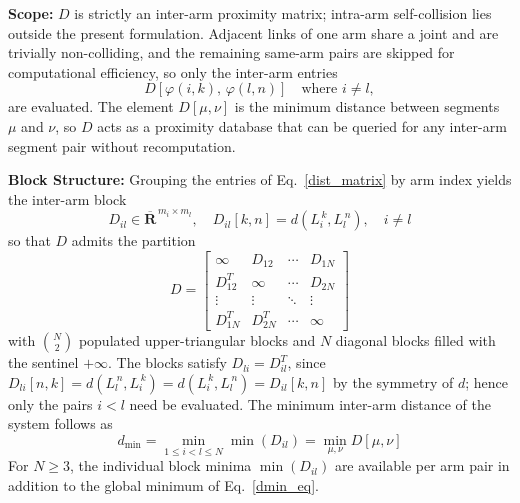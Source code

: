 \noindent\textbf{Scope:} $D$ is strictly an inter-arm proximity matrix; intra-arm self-collision lies outside the present formulation. Adjacent links of one arm share a joint and are trivially non-colliding, and the remaining same-arm pairs are skipped for computational efficiency, so only the inter-arm entries
\begin{equation}
D\left[ \varphi(i,k),\, \varphi(l,n) \right] \quad \text{where } i \neq l,
\label{eq:dm_intermatrix}
\end{equation}
are evaluated. The element $D[\mu,\nu]$ is the minimum distance between segments $\mu$ and $\nu$, so $D$ acts as a proximity database that can be queried for any inter-arm segment pair without recomputation.

\noindent\textbf{Block Structure:} Grouping the entries of Eq.~\ref{dist_matrix} by arm index yields the inter-arm block
\begin{equation}
D_{il} \in \overline{\mathbf{R}}^{\,m_i \times m_l}, \quad D_{il}[k,n] = d(L_i^{\,k}, L_l^{\,n}), \quad i \neq l
\label{block_eq}
\end{equation}
so that $D$ admits the partition
\begin{equation}
D =
\begin{bmatrix}
\boldsymbol{\infty} & D_{12} & \cdots & D_{1N}\\
D_{12}^{T} & \boldsymbol{\infty} & \cdots & D_{2N}\\
\vdots & \vdots & \ddots & \vdots\\
D_{1N}^{T} & D_{2N}^{T} & \cdots & \boldsymbol{\infty}
\end{bmatrix}
\label{block_partition}
\end{equation}
with $\binom{N}{2}$ populated upper-triangular blocks and $N$ diagonal blocks filled with the sentinel $+\infty$. The blocks satisfy $D_{li} = D_{il}^{T}$, since $D_{li}[n, k] = d(L_l^{\,n},L_i^{\,k}) = d(L_i^{\,k},L_l^{\,n}) = D_{il}[k,n]$ by the symmetry of $d$; hence only the pairs $i < l$ need be evaluated. The minimum inter-arm distance of the system follows as
\begin{equation}
d_{\min} = \min_{1 \leq i < l \leq N} \min\left( D_{il} \right) = \min_{\mu,\nu} D[\mu,\nu]
\label{dmin_eq}
\end{equation}
For $N \geq 3$, the individual block minima $\min(D_{il})$ are available per arm pair in addition to the global minimum of Eq.~\ref{dmin_eq}.

